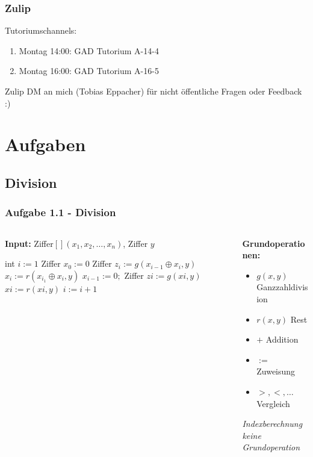 \documentclass{beamer}
\begin{document}
\begin{frame}
	\frametitle{Zulip}
	Tutoriumschannels:

   \begin{enumerate}
      \item Montag 14:00: GAD Tutorium A-14-4
      \item Montag 16:00: GAD Tutorium A-16-5
   \end{enumerate}

   Zulip DM an mich (Tobias Eppacher) für nicht öffentliche Fragen oder Feedback :)
\end{frame}



\section{Aufgaben}

\subsection{Division}
\begin{frame}
	\frametitle{Aufgabe 1.1 - Division}
	\begin{columns}[T]

		\begin{column}{.57\textwidth}
			\textbf{Input:} Ziffer$[](x_1, x_2, \dots, x_n)$, Ziffer $y$
			\begin{algorithmic}[1]
				\State int $i := 1$
				\State Ziffer $x_0 := 0$
				\State Ziffer $z_i := g(x_{i-1} \oplus  x_i, y)$
				\State $x_i := r(x_{i_1} \oplus x_i, y)$
				\State $x_{i-1} := 0;$
				\Else
				\State Ziffer $zi := g(xi, y)$
				\State $xi := r(xi, y)$
				\EndIf
				\State $i := i + 1$
				\EndWhile
			\end{algorithmic}
		\end{column}
		\begin{column}{.41\textwidth}

			\textbf{Grundoperationen:}
			\begin{itemize}
				\item $g(x, y)$ Ganzzahldivision
				\item $r(x, y)$ Rest
				\item $+$ Addition
				\item $:=$ Zuweisung
				\item $>, <, \dots$ Vergleich
			\end{itemize}
			\textit{Indexberechnung keine Grundoperation}
		\end{column}
	\end{columns}
\end{frame}
\end{document}
